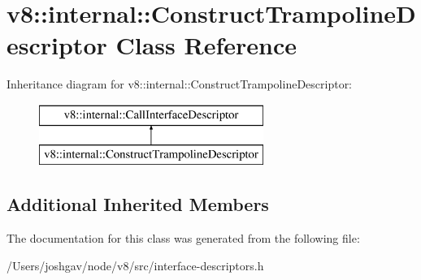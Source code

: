 \hypertarget{classv8_1_1internal_1_1_construct_trampoline_descriptor}{}\section{v8\+:\+:internal\+:\+:Construct\+Trampoline\+Descriptor Class Reference}
\label{classv8_1_1internal_1_1_construct_trampoline_descriptor}
Inheritance diagram for v8\+:\+:internal\+:\+:Construct\+Trampoline\+Descriptor\+:\begin{figure}[H]
\begin{center}
\leavevmode
\includegraphics[height=2.000000cm]{classv8_1_1internal_1_1_construct_trampoline_descriptor}
\end{center}
\end{figure}
\subsection*{Additional Inherited Members}


The documentation for this class was generated from the following file\+:\begin{DoxyCompactItemize}
\item 
/\+Users/joshgav/node/v8/src/interface-\/descriptors.\+h\end{DoxyCompactItemize}
